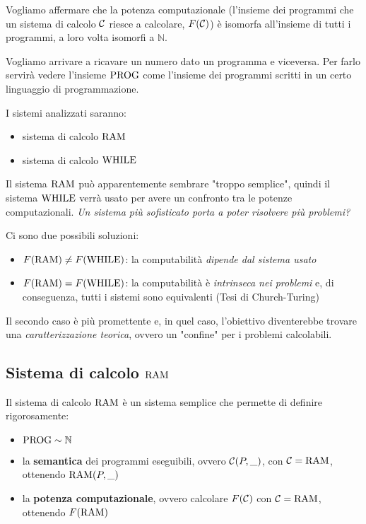 Vogliamo affermare che la potenza computazionale (l'insieme dei programmi che un sistema di calcolo $\mathcal{C}$ riesce a calcolare, $F(\mathcal{C})$) è isomorfa all'insieme di tutti i programmi, a loro volta isomorfi a $\mathbb{N}$. 

Vogliamo arrivare a ricavare un numero dato un programma e viceversa. Per farlo servirà vedere l'insieme $\text{PROG}$ come l'insieme dei programmi scritti in un certo linguaggio di programmazione.

I sistemi analizzati saranno: 
\begin{itemize}
	\item sistema di calcolo $\text{RAM}$
    
	\item sistema di calcolo $\text{WHILE}$
\end{itemize}

Il sistema $\text{RAM}$ può apparentemente sembrare "troppo semplice", quindi il sistema $\text{WHILE}$ verrà usato per avere un confronto tra le potenze computazionali. \textit{Un sistema più sofisticato porta a poter risolvere più problemi?}

Ci sono due possibili soluzioni: 
\begin{itemize}
	\item $F(\text{RAM}) \neq F(\text{WHILE})$: la computabilità \textit{dipende dal sistema usato}
    
	\item $F(\text{RAM}) = F(\text{WHILE})$: la computabilità è \textit{intrinseca nei problemi} e, di conseguenza, tutti i sistemi sono equivalenti (Tesi di Church-Turing)
\end{itemize}

Il secondo caso è più promettente e, in quel caso, l'obiettivo diventerebbe trovare una \textit{caratterizzazione teorica}, ovvero un "confine" per i problemi calcolabili.

\subsection{Sistema di calcolo $\text{RAM}$}

Il sistema di calcolo $\text{RAM}$ è un sistema semplice che permette di definire rigorosamente: 
\begin{itemize}
	\item $\text{PROG} \sim \mathbb{N}$

	\item la \textbf{semantica} dei programmi eseguibili, ovvero $\mathcal{C}(P,\_)$, con $\mathcal{C} = \text{RAM}$, ottenendo $\text{RAM} (P,\_)$

	\item la \textbf{potenza computazionale}, ovvero calcolare $F(\mathcal{C})$ con $\mathcal{C} = \text{RAM}$, ottenendo $F(\text{RAM})$
\end{itemize}

